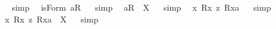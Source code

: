 \begin{isabellebody}
\isadelimproof
\ %
\endisadelimproof
%
\isatagproof
{}\isamarkupfalse%
\ {\isacharparenleft}simp{\isacharparenright}\ \isamarkupfalse%
%
\endisatagproof
{\isafoldproof}%
%
\isadelimproof
%
\endisadelimproof
\isanewline
{}\isamarkupfalse%
\ {\isachardoublequoteopen}isForm\ {\isacharless}a{\isasymcirc}R{}{\isachargreater}{\isachardoublequoteclose}%
\isadelimproof
\ %
\endisadelimproof
%
\isatagproof
{}\isamarkupfalse%
\ {\isacharparenleft}simp{\isacharparenright}\ \isamarkupfalse%
%
\endisatagproof
{\isafoldproof}%
%
\isadelimproof
%
\endisadelimproof
\isanewline
{}\isamarkupfalse%
\ {\isachardoublequoteopen}{\isacharless}a{\isasymcirc}R{}{\isachargreater}\ {\isacharequal}\ X{\isachardoublequoteclose}%
\isadelimproof
\ %
\endisadelimproof
%
\isatagproof
{}\isamarkupfalse%
\ {\isacharparenleft}simp{\isacharparenright}\ \isamarkupfalse%
%
\endisatagproof
{\isafoldproof}%
%
\isadelimproof
%
\endisadelimproof
\isanewline
\isanewline
{}\isamarkupfalse%
\ {\isachardoublequoteopen}{\isacharbrackleft}{\isacharless}{\isasymlambda}x{\isachardot}\ {\isacharless}R{}{\isasymbullet}{\isachardot}x{\isachardot}{\isachargreater}\ {\isasymrightarrow}\isactrlsup z\ {\isacharless}R{}{\isasymbullet}{\isachardot}x{\isachardot}{\isachargreater}{\isacharparenright}{\isasymbullet}a{\isachargreater}{\isacharbrackright}{\isachardoublequoteclose}%
\isadelimproof
\ %
\endisadelimproof
%
\isatagproof
{}\isamarkupfalse%
\ {\isacharparenleft}simp{\isacharparenright}\ \isamarkupfalse%
%
\endisatagproof
{\isafoldproof}%
%
\isadelimproof
%
\endisadelimproof
\isanewline
{}\isamarkupfalse%
\ {\isachardoublequoteopen}{\isacharless}{\isasymlambda}x{\isachardot}\ {\isacharless}R{}{\isasymbullet}{\isachardot}x{\isachardot}{\isachargreater}\ {\isasymrightarrow}\isactrlsup z\ {\isacharless}R{}{\isasymbullet}{\isachardot}x{\isachardot}{\isachargreater}{\isacharparenright}{\isasymbullet}a{\isachargreater}\ {\isacharequal}\ X{\isachardoublequoteclose}%
\isadelimproof
\ %
\endisadelimproof
%
\isatagproof
{}\isamarkupfalse%
\ {\isacharparenleft}simp{\isacharparenright}\ \isamarkupfalse%
%
\endisatagproof
{\isafoldproof}%
%
\isadelimproof
%
\endisadelimproof
\isanewline
\isanewline
{}\isamarkupfalse%

\end{isabellebody}
